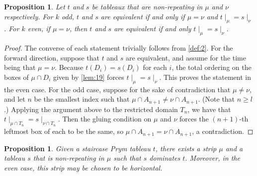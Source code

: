 \documentclass[11pt,reqno]{amsart}
\newcommand*{\restrict}[1]{{\mid}_{#1}}
\theoremstyle{definition}
\theoremstyle{problem}
\theoremstyle{plain}
\newtheorem{proposition}[definition]{Proposition}
\theoremstyle{remark}
\theoremstyle{theorem}
\numberwithin{equation}{section}
\numberwithin{figure}{section}
\begin{document}
\begin{proposition}\label{prop:2}
  Let $t$ and $s$ be tableaux that are non-repeating in $\mu$ and
  $\nu$ respectively.  For $k$ odd, $t$ and $s$ are equivalent if and
  only if $\mu=\nu$ and $t\restrict\mu = s\restrict\nu$.  For $k$
  even, if $\mu = \nu$, then $t$ and $s$ are equivalent if and only
  $t\restrict\mu = s\restrict\nu$.
\end{proposition}

\begin{proof}
  The converse of each statement trivially follows from \cref{def:2}.
  For the forward direction, suppose that $t$ and $s$ are equivalent,
  and assume for the time being that $\mu = \nu$.  Because
  $t(D_i) = s(D_i)$ for each $i$, the total ordering on the boxes of
  $\mu \cap D_i$ given by \cref{lem:19} forces
  $t\restrict{\mu} = s\restrict{\nu}$.  This proves the statement in
  the even case.  For the odd case, suppose for the sake of
  contradiction that $\mu \neq \nu$, and let $n$ be the smallest index
  such that $\mu \cap A_{n+1} \neq \nu \cap A_{n+1}$.  (Note that
  $n \geq l$.)  Applying the argument above to the restricted domain
  $T_n$, we have that
  $t\restrict{\mu \cap T_n} = s\restrict{\nu \cap T_n}$.  Then the
  gluing condition on $\mu$ and $\nu$ forces the $(n+1)$-th leftmost
  box of each to be the same, so
  $\mu \cap A_{n+1} = \nu \cap A_{n+1}$, a contradiction.
\end{proof}

\begin{proposition}\label{prop:14}
  Given a staircase Prym tableau $t$, there exists a strip $\mu$ and a
  tableau $s$ that is non-repeating in $\mu$ such that $s$ dominates
  $t$. Moreover, in the even case, this strip may be chosen to be
  horizontal.
\end{proposition}
\end{document}
